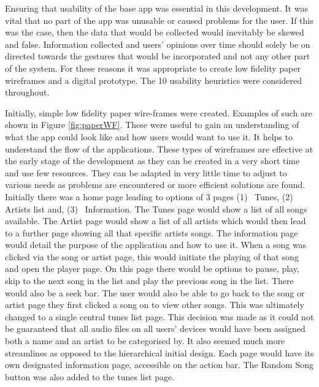 \documentclass{l4proj}
\begin{document}
Ensuring that usability of the base app was essential in this development. It was vital that no part of the app was unusable or caused problems for the user. If this was the case, then the data that would be collected would inevitably be skewed and false. Information collected and users’ opinions over time should solely be on directed towards the gestures that would be incorporated and not any other part of the system. For these reasons it was appropriate to create low fidelity paper wireframes and a digital prototype. The 10 usability heuristics were considered throughout.

Initially, simple low fidelity paper wire-frames were created. Examples of such are shown in Figure \ref{fig:paperWF}. These were useful to gain an understanding of what the app could look like and how users would want to use it. It helps to understand the flow of the applications. These types of wireframes are effective at the early stage of the development as they can be created in a very short time and use few resources. They can be adapted in very little time to adjust to various needs as problems are encountered or more efficient solutions are found. Initially there was a home page leading to options of 3 pages (1)~ Tunes, (2)~ Artists list and, (3)~ Information. The Tunes page would show a list of all songs available. The Artist page would show a list of all artists which would then lead to a further page showing all that specific artists songs. The information page would detail the purpose of the application and how to use it. When a song was clicked via the song or artist page, this would initiate the playing of that song and open the player page. On this page there would be options to pause, play, skip to the next song in the list and play the previous song in the list. There would also be a seek bar. The user would also be able to go back to the song or artist page they first clicked a song on to view other songs. This was ultimately changed to a single central tunes list page. This decision was made as it could not be guaranteed that all audio files on all users’ devices would have been assigned both a name and an artist to be categorised by. It also seemed much more streamlines as opposed to the hierarchical initial design. Each page would have its own designated information page, accessible on the action bar. The Random Song button was also added to the tunes list page.
\end{document}
